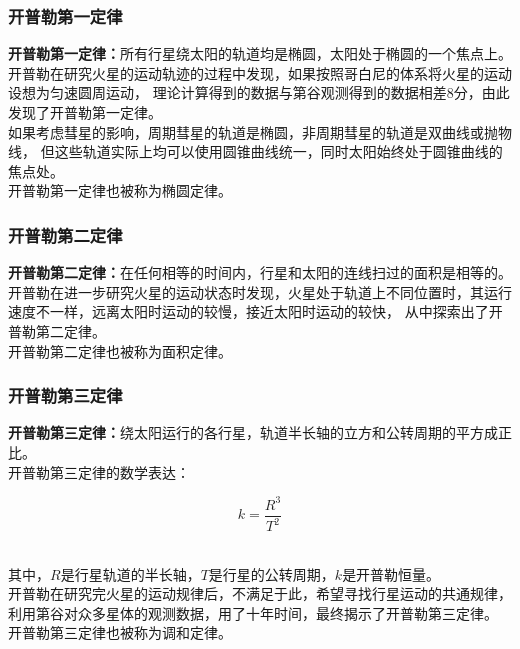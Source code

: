 \documentclass[UTF8]{ctexart}
\begin{document}
\subsubsection{开普勒第一定律}
    \textbf{开普勒第一定律：}所有行星绕太阳的轨道均是椭圆，太阳处于椭圆的一个焦点上。\\[3mm]
    开普勒在研究火星的运动轨迹的过程中发现，如果按照哥白尼的体系将火星的运动设想为匀速圆周运动，
    理论计算得到的数据与第谷观测得到的数据相差$8$分，由此发现了开普勒第一定律。\\[3mm]
    如果考虑彗星的影响，周期彗星的轨道是椭圆，非周期彗星的轨道是双曲线或抛物线，
    但这些轨道实际上均可以使用圆锥曲线统一，同时太阳始终处于圆锥曲线的焦点处。\\[3mm]
    开普勒第一定律也被称为椭圆定律。\\

\subsubsection{开普勒第二定律}
    \textbf{开普勒第二定律：}在任何相等的时间内，行星和太阳的连线扫过的面积是相等的。\\[3mm]
    开普勒在进一步研究火星的运动状态时发现，火星处于轨道上不同位置时，其运行速度不一样，远离太阳时运动的较慢，接近太阳时运动的较快，
    从中探索出了开普勒第二定律。\\[3mm]
    开普勒第二定律也被称为面积定律。\\

\subsubsection{开普勒第三定律}
    \textbf{开普勒第三定律：}绕太阳运行的各行星，轨道半长轴的立方和公转周期的平方成正比。\\[3mm]
    开普勒第三定律的数学表达：
    \begin{large}
        \begin{equation*}
            k=\frac{R^3}{T^2}
        \end{equation*}
    \end{large}\\
    其中，$R$是行星轨道的半长轴，$T$是行星的公转周期，$k$是开普勒恒量。\\[4mm]
    开普勒在研究完火星的运动规律后，不满足于此，希望寻找行星运动的共通规律，
    利用第谷对众多星体的观测数据，用了十年时间，最终揭示了开普勒第三定律。\\[3mm]
    开普勒第三定律也被称为调和定律。
\end{document}
